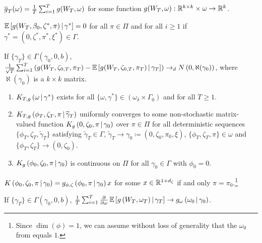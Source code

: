 \documentclass[11pt, letterpaper, twoside, final]{article}
\begin{document}
\begin{appendices}
  
  \begin{assump}[GMM 3]\label{ass:GMM3}
  \begin{assumplist}
    \item $\overline{g}_T(\omega) = \frac{1}{T} \sum_{i=1}^T g(W_T, \omega)$ for some function $g(W_T,
      \omega) : \mathbb{R}^{k \times k} \times \omega \to \mathbb{R}^k$.
      \label{ass:GMM3a}
    \item $\operatorname{\mathbb{E}}\left[g(W_T, \beta_0, \zeta^{*}, \pi) \,\middle\vert\, \gamma^{*} \right] = 0$ for all $\pi \in \Pi$ and
      for all $i \geq 1$ if $\gamma^{*} = \left(0,\zeta^{*}, \pi^{*}, \xi^{*} \right) \in \Gamma$.
      \label{ass:GMM3b}
    \item If $\{ \gamma_T \} \in \Gamma(\gamma_0, 0, b)$, $\frac{1}{\sqrt{T}} \sum_{i=1}^T \left(g(W_T,
      \zeta_{0,T}, \pi_T) - \operatorname{\mathbb{E}} \left[g(W_T, \zeta_{0,T}, \pi_T)\,\middle\vert\, \gamma_T \right]\right) \to_d N\left(0,
      \aleph(\gamma_0)\right)$, where $\aleph(\gamma_0)$ is a $k \times k$ matrix.
      \label{ass:GMM3c}
    \item 
      \label{ass:GMM3d}
      \begin{enumerate}
        \item $K_{T,g}\left(\omega \,\middle\vert\, \gamma^{*}\right)$ exists for all $\{\omega, \gamma^{*} \} \in
          \left(\omega_{\delta} \times \Gamma_{0}\right)$ and for all $T \geq 1$.
        \item $K_{T,g}\left(\phi_T, \zeta_T, \pi \,\middle\vert\, \widetilde{\gamma}_T\right)$ uniformly converges
          to some non-stochastic matrix-valued function $K_{g}\left(0, \zeta_0, \pi \,\middle\vert\,
          \gamma_0\right)$ over $\pi \in \Pi$ for all deterministic sequences $\{\phi_T, \zeta_T,
          \widetilde{\gamma}_T \}$ satisfying $\widetilde{\gamma}_T \in \Gamma$, $\widetilde{\gamma}_T
          \to \gamma_0 \coloneqq (0, \zeta_0, \pi_0, \xi)$, $\{\phi_T, \zeta_T, \pi \} \in \omega$ and
          $\{\phi_T, \zeta_T \} \to (0, \zeta_0)$.
        \item $K_g\left(\phi_0, \zeta_0, \pi \,\middle\vert\, \gamma_0\right)$ is continuous on $\Pi$ for all
          $\gamma_0 \in \Gamma$ with $\phi_0 = 0$.
      \end{enumerate}
      \item $K\left(\phi_0, \zeta_0, \pi \,\middle\vert\, \gamma_0\right) = g_{\phi, \zeta}\left(\phi_0,
        \pi\,\middle\vert\, \gamma_0\right) x$ for some $x \in \mathbb{R}^{1+d_{\zeta}}$ if and only $\pi =
        \pi_0$.\footnote{Since $\dim(\phi) = 1$, we can assume without loss of generality that the
        $\omega_0$ from \textcite{andrews2014Gmm} equals $1$.}
        \label{ass:GMM3e}
      \item If $\{ \gamma_T \} \in \Gamma(\gamma_0, 0, b)$, $\frac{1}{T} \sum_{i=1}^T
        \frac{\partial}{\partial \omega} \operatorname{\mathbb{E}}\left[ g\left(W_T, \omega_T \right ) \,\middle\vert\, \gamma_T \right]
        \to g_{\omega}\left(\omega_0 \,\middle\vert\, \gamma_0\right)$.
      \label{ass:GMM3f}
  \end{assumplist}
  \end{assump}


\end{appendices}
\end{document}
